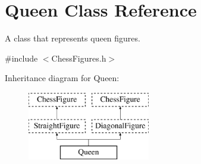 \hypertarget{classQueen}{}\section{Queen Class Reference}
\label{classQueen}


A class that represents queen figures.  




{\ttfamily \#include $<$Chess\+Figures.\+h$>$}

Inheritance diagram for Queen\+:\begin{figure}[H]
\begin{center}
\leavevmode
\includegraphics[height=3.000000cm]{classQueen}
\end{center}
\end{figure}
